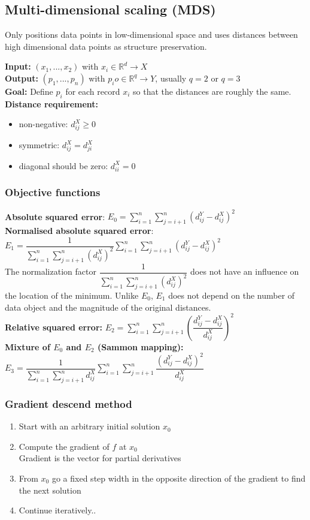 \documentclass[fleqn, oneside, 10pt, titlepage]{article}
\begin{document}
\subsection{Multi-dimensional scaling (MDS)}
Only positions data points in low-dimensional space and uses distances between high dimensional data points as structure preservation.

\textbf{Input:} $(x_1, ..., x_2)$ with $x_i \in \mathbb{R}^d \rightarrow X$\\
\textbf{Output:} $(p_1, ..., p_n)$ with $p_io \in \mathbb{R}^q \rightarrow Y$, usually $q = 2$ or $q = 3$\\
\textbf{Goal:} Define $p_i$ for each record $x_i$ so that the distances are roughly the same.\\

\textbf{Distance requirement:}
\begin{itemize}
	\item non-negative: $d_{ij}^X \geq 0$
	\item symmetric: $d_{ij}^X = d_{ji}^X$
	\item diagonal should be zero: $d_{ii}^X = 0$
\end{itemize}

\subsubsection{Objective functions}
\textbf{Absolute squared error}: $E_0 = \sum_{i=1}^n \sum_{j=i+1}^n (d_{ij}^Y - d_{ij}^X)^2$\\
\textbf{Normalised absolute squared error}: $E_1 = \dfrac{1}{\sum_{i=1}^n \sum_{j=i+1}^n (d_{ij}^X)^2}\sum_{i=1}^n \sum_{j=i+1}^n (d_{ij}^Y - d_{ij}^X)^2$\\

The normalization factor $\dfrac{1}{\sum_{i=1}^n \sum_{j=i+1}^n (d_{ij}^X)^2}$ does not have an influence on the location of the minimum. Unlike $E_0$, $E_1$ does not depend on the number of data object and the magnitude of the original distances.\\

\textbf{Relative squared error:} $E_2 = \sum_{i=1}^n \sum_{j=i+1}^n \left( \dfrac{d_{ij}^Y - d_{ij}^X}{d_{ij}^X} \right)^2$\\
\textbf{Mixture of $E_0$ and $E_2$ (Sammon mapping):} $E_3 = \dfrac{1}{\sum_{i=1}^n \sum_{j=i+1}^n d_{ij}^X} \sum_{i=1}^n \sum_{j=i+1}^n \dfrac{(d_{ij}^Y - d_{ij}^X)^2}{d_{ij}^X}$

\subsubsection{Gradient descend method}
\begin{enumerate}
	\item Start with an arbitrary initial solution $x_0$
	\item Compute the gradient of $f$ at $x_0$\\
			Gradient is the vector for partial derivatives
	\item From $x_0$ go a fixed step width in the opposite direction of the gradient to find the next solution
	\item Continue iteratively..
\end{enumerate}
\end{document}
